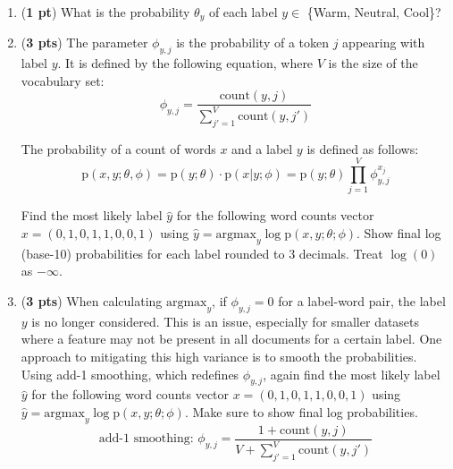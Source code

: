 \documentclass[11pt, letterpaper]{article}
\begin{document}
    \begin{enumerate}[label=\alph*.]
        \item (\textbf{1 pt}) What is the probability $\theta_y$ of each label $y \in$ \{Warm, Neutral, Cool\}?\\
        
        \item (\textbf{3 pts}) The parameter $\phi_{y, j}$ is the probability of a token $j$ appearing with label $y$. It is defined by the following equation, where $V$ is the size of the vocabulary set:
        $$ \phi_{y, j} = \frac{\text{count}(y, j)}{\sum^V_{j'=1}\text{count}(y, j')}$$
        
        The probability of a count of words $x$ and a label $y$ is defined as follows:
        $$ \mathrm{p}(x, y; \theta, \phi) = \mathrm{p}(y; \theta) \cdot \mathrm{p}(x|y; \phi) = \mathrm{p}(y; \theta)\prod^V_{j=1} \phi^{x_j}_{y, j} $$
        
        Find the most likely label $\hat y$ for the following word counts vector $x = (0,1,0,1,1,0,0,1)$ using $\hat y = \text{argmax}_y \log \mathrm{p}(x, y; \theta; \phi)$. Show final log (base-10) probabilities for each label rounded to 3 decimals. Treat $\log(0)$ as $-\infty$.
        
        \item (\textbf{3 pts}) When calculating $\text{argmax}_y$, if $\phi_{y, j} = 0$ for a label-word pair, the label $y$  is no longer considered. This is an issue, especially for smaller datasets where a feature may not be present in all documents for a certain label. One approach to mitigating this high variance is to smooth the probabilities. Using add-1 smoothing, which redefines $\phi_{y, j}$, again find the most likely label $\hat y$ for the following word counts vector $x = (0,1,0,1,1,0,0,1)$ using $\hat y = \text{argmax}_y \log \mathrm{p}(x, y; \theta; \phi)$. Make sure to show final log probabilities.\\
        $$\text{add-1 smoothing: } \phi_{y, j} = \frac{1 + \text{count}(y, j)}{V + \sum^V_{j'=1}\text{count}(y, j')}$$\\
    \end{enumerate}
    
\newpage
\end{document}
